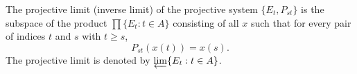 The projective limit (inverse limit) of the projective system $\{E_t, P_{st}\}$ is the subspace of the product $\prod \{E_t : t \in A\}$ consisting of all $x$ such that for every pair of indices $t$ and $s$ with $t \geq s$,
$$
P_{st}(x(t)) = x(s).
$$
The projective limit is denoted by $\varprojlim \{E_t : t \in A\}$.
